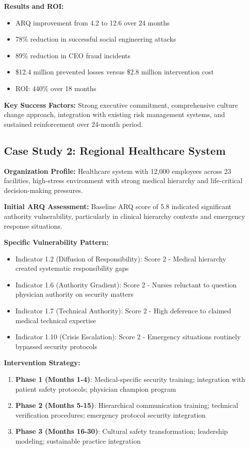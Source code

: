 \documentclass[11pt,a4paper]{article}
\begin{document}
\textbf{Results and ROI:}
\begin{itemize}
\item ARQ improvement from 4.2 to 12.6 over 24 months
\item 78\% reduction in successful social engineering attacks
\item 89\% reduction in CEO fraud incidents
\item \$12.4 million prevented losses versus \$2.8 million intervention cost
\item ROI: 440\% over 18 months
\end{itemize}

\textbf{Key Success Factors:}
Strong executive commitment, comprehensive culture change approach, integration with existing risk management systems, and sustained reinforcement over 24-month period.

\subsection{Case Study 2: Regional Healthcare System}

\textbf{Organization Profile:}
Healthcare system with 12,000 employees across 23 facilities, high-stress environment with strong medical hierarchy and life-critical decision-making pressures.

\textbf{Initial ARQ Assessment:}
Baseline ARQ score of 5.8 indicated significant authority vulnerability, particularly in clinical hierarchy contexts and emergency response situations.

\textbf{Specific Vulnerability Pattern:}
\begin{itemize}
\item Indicator 1.2 (Diffusion of Responsibility): Score 2 - Medical hierarchy created systematic responsibility gaps
\item Indicator 1.6 (Authority Gradient): Score 2 - Nurses reluctant to question physician authority on security matters
\item Indicator 1.7 (Technical Authority): Score 2 - High deference to claimed medical technical expertise
\item Indicator 1.10 (Crisis Escalation): Score 2 - Emergency situations routinely bypassed security protocols
\end{itemize}

\textbf{Intervention Strategy:}
\begin{enumerate}
\item \textbf{Phase 1 (Months 1-4)}: Medical-specific security training; integration with patient safety protocols; physician champion program
\item \textbf{Phase 2 (Months 5-15)}: Hierarchical communication training; technical verification procedures; emergency protocol security integration
\item \textbf{Phase 3 (Months 16-30)}: Cultural safety transformation; leadership modeling; sustainable practice integration
\end{enumerate}
\end{document}
